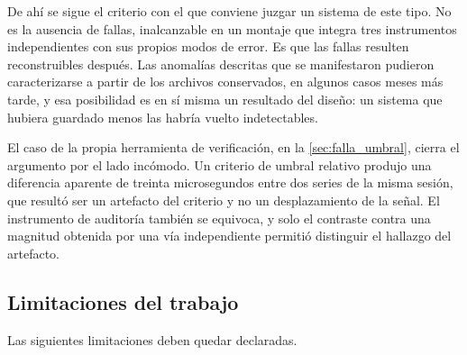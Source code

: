 De ahí se sigue el criterio con el que conviene juzgar un sistema de
este tipo. No es la ausencia de fallas, inalcanzable en un montaje que
integra tres instrumentos independientes con sus propios modos de
error. Es que las fallas resulten reconstruibles después. Las
anomalías descritas que se manifestaron pudieron caracterizarse a
partir de los archivos conservados, en algunos casos meses más tarde, y
esa posibilidad es en sí misma un resultado del diseño: un sistema que hubiera guardado menos
las habría vuelto indetectables.

El caso de la propia herramienta de verificación, en la
\cref{sec:falla_umbral}, cierra el argumento por el lado incómodo. Un
criterio de umbral relativo produjo una diferencia aparente de treinta
microsegundos entre dos series de la misma sesión, que resultó ser un
artefacto del criterio y no un desplazamiento de la señal. El
instrumento de auditoría también se equivoca, y solo el contraste
contra una magnitud obtenida por una vía independiente permitió
distinguir el hallazgo del artefacto.

\subsection*{Limitaciones del trabajo}
\label{sec:limitaciones}

Las siguientes limitaciones deben quedar declaradas.

